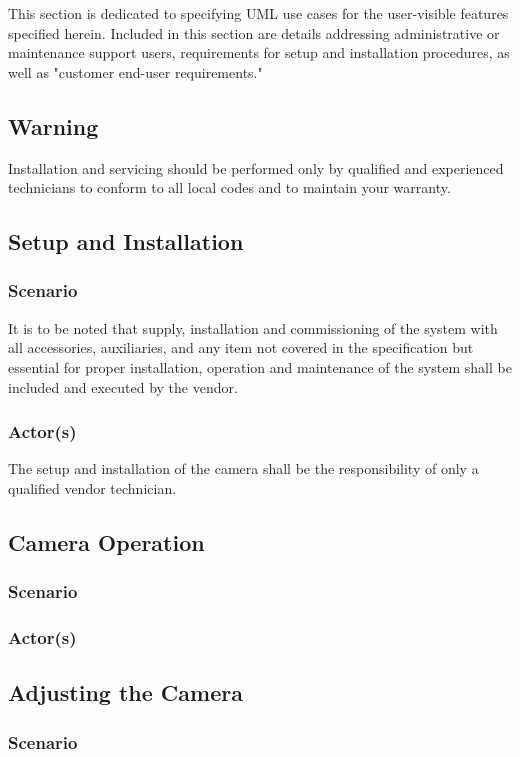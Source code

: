 This section is dedicated to specifying UML use cases for the user-visible features specified herein. Included in this section are details addressing administrative or maintenance support users, requirements for setup and installation procedures, as well as "customer end-user requirements."

\subsection{Warning}
Installation and servicing should be performed only by qualified and experienced technicians to conform to all local codes and to maintain your warranty.
\subsection{Setup and Installation}
\subsubsection{Scenario}
It is to be noted that supply, installation and commissioning of the system with all accessories, auxiliaries, and any item not covered in the specification but essential for proper installation, operation and maintenance of the system shall be included and executed by the vendor.
\subsubsection{Actor(s)}
The setup and installation of the camera shall be the responsibility of only a qualified vendor technician.
\subsection{Camera Operation}
\subsubsection{Scenario}

\subsubsection{Actor(s)}

\subsection{Adjusting the Camera}
\subsubsection{Scenario}

